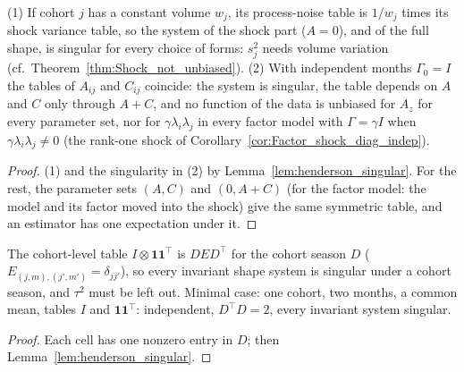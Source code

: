 \begin{theorem}\label{thm:Factor_henderson_singular}
  \leanok
  (1) If cohort $j$ has a constant volume $w_j$, its process-noise table is $1/w_j$ times its
  shock variance table, so the system of the shock part ($A = 0$), and of the full shape, is
  singular for every choice of forms: $s_j^2$ needs volume variation
  (cf.\ Theorem~\ref{thm:Shock_not_unbiased}).
  (2) With independent months $\Gamma_0 = I$ the tables of $A_{ij}$ and $C_{ij}$ coincide: the
  system is singular, the table depends on $A$ and $C$ only through $A + C$, and no function of
  the data is unbiased for $A_z$ for every parameter set, nor for $\gamma\lambda_i\lambda_j$ in
  every factor model with $\Gamma = \gamma I$ when $\gamma\lambda_i\lambda_j \ne 0$
  (the rank-one shock of Corollary~\ref{cor:Factor_shock_diag_indep}).
\end{theorem}
\begin{proof}
  \leanok
  (1) and the singularity in (2) by Lemma~\ref{lem:henderson_singular}. For the rest, the
  parameter sets $(A, C)$ and $(0, A + C)$ (for the factor model: the model and its factor moved
  into the shock) give the same symmetric table, and an estimator has one expectation under it.
\end{proof}

\begin{theorem}\label{thm:Factor_card_level}
  \leanok
  The cohort-level table $I\otimes\mathbf 1\mathbf 1^\top$ is $DED^\top$ for the cohort season $D$
  ($E_{(j,m),(j',m')} = \delta_{jj'}$), so every invariant shape system is singular under a cohort
  season, and $\tau^2$ must be left out. Minimal case: one cohort, two months, a common mean,
  tables $I$ and $\mathbf 1\mathbf 1^\top$: independent, $D^\top D = 2$, every invariant
  system singular.
\end{theorem}
\begin{proof}
  \leanok
  Each cell has one nonzero entry in $D$; then Lemma~\ref{lem:henderson_singular}.
\end{proof}


